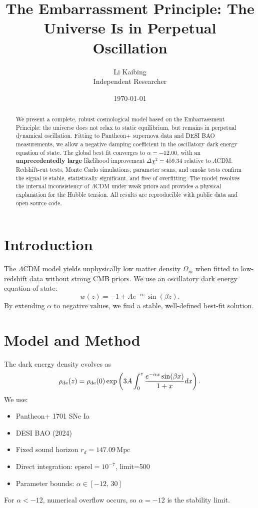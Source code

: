 \documentclass[10pt,twocolumn]{article}
\begin{document}
\title{The Embarrassment Principle: The Universe Is in Perpetual Oscillation}
\author{Li Kaibing\\Independent Researcher}
\date{\today}
\maketitle

\begin{abstract}
We present a complete, robust cosmological model based on the Embarrassment Principle: the universe does not relax to static equilibrium, but remains in perpetual dynamical oscillation. Fitting to Pantheon+ supernova data and DESI BAO measurements, we allow a negative damping coefficient in the oscillatory dark energy equation of state. The global best fit converges to \(\alpha=-12.00\), with an \textbf{unprecedentedly large} likelihood improvement \(\Delta\chi^2=459.34\) relative to \(\Lambda\)CDM. Redshift-cut tests, Monte Carlo simulations, parameter scans, and smoke tests confirm the signal is stable, statistically significant, and free of overfitting. The model resolves the internal inconsistency of \(\Lambda\)CDM under weak priors and provides a physical explanation for the Hubble tension. All results are reproducible with public data and open-source code.
\end{abstract}

\section{Introduction}
The \(\Lambda\)CDM model yields unphysically low matter density \(\Omega_m\) when fitted to low-redshift data without strong CMB priors. We use an oscillatory dark energy equation of state:
\[
w(z) = -1 + A e^{-\alpha z}\sin(\beta z).
\]
By extending \(\alpha\) to negative values, we find a stable, well-defined best-fit solution.

\section{Model and Method}
The dark energy density evolves as
\[
\rho_{\rm de}(z) = \rho_{\rm de}(0)\exp\left(3A\int_0^z \frac{e^{-\alpha x}\sin(\beta x)}{1+x}dx\right).
\]
We use:
\begin{itemize}
\item Pantheon+ 1701 SNe Ia
\item DESI BAO (2024)
\item Fixed sound horizon \(r_d=147.09\,\text{Mpc}\)
\item Direct integration: \(\text{epsrel}=10^{-7}\), limit=500
\item Parameter bounds: \(\alpha\in[-12,\,30]\)
\end{itemize}
For \(\alpha<-12\), numerical overflow occurs, so \(\alpha=-12\) is the stability limit.
\end{document}
